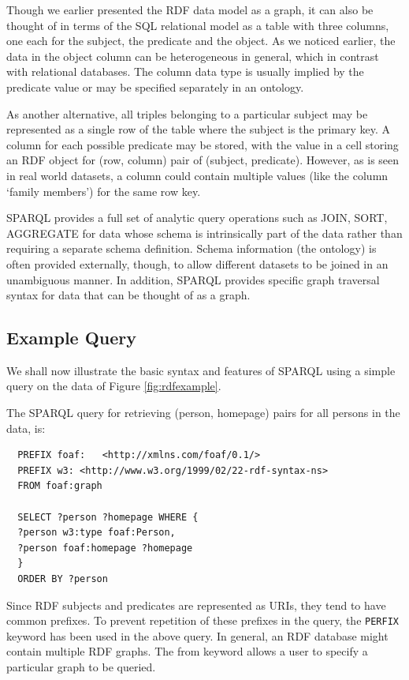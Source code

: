 \documentclass[a4paper, twoside, 12pt]{report}
\begin{document}
Though we earlier presented the RDF data model as a graph, it can also be thought of in terms of the SQL relational model as a table with three columns, one each for the subject, the predicate and the object. As we noticed earlier, the data in the object column can be heterogeneous in general, which in contrast with relational databases. The column data type is usually implied by the predicate value or may be specified separately in an ontology.

As another alternative, all triples belonging to a particular subject may be represented as a single row of the table where the subject is the primary key. A column for each possible predicate may be stored, with the value in a cell storing an RDF object for (row, column) pair of (subject, predicate). However, as is seen in real world datasets, a column could contain multiple values (like the column `family members') for the same row key.

SPARQL provides a full set of analytic query operations such as JOIN, SORT, AGGREGATE for data whose schema is intrinsically part of the data rather than requiring a separate schema definition. Schema information (the ontology) is often provided externally, though, to allow different datasets to be joined in an unambiguous manner. In addition, SPARQL provides specific graph traversal syntax for data that can be thought of as a graph.

\subsection{Example Query}

We shall now illustrate the basic syntax and features of SPARQL using a simple query on the data of Figure \ref{fig:rdfexample}.

The SPARQL query for retrieving (person, homepage) pairs for all persons in the data, is:
\begin{verbatim}
  PREFIX foaf:   <http://xmlns.com/foaf/0.1/>
  PREFIX w3: <http://www.w3.org/1999/02/22-rdf-syntax-ns>
  FROM foaf:graph

  SELECT ?person ?homepage WHERE {
  ?person w3:type foaf:Person,
  ?person foaf:homepage ?homepage
  }
  ORDER BY ?person
\end{verbatim}

Since RDF subjects and predicates are represented as URIs, they tend to have common prefixes. To prevent repetition of these prefixes in the query, the \verb|PERFIX| keyword has been used in the above query. In general, an RDF database might contain multiple RDF graphs. The from keyword allows a user to specify a particular graph to be queried.
\end{document}
